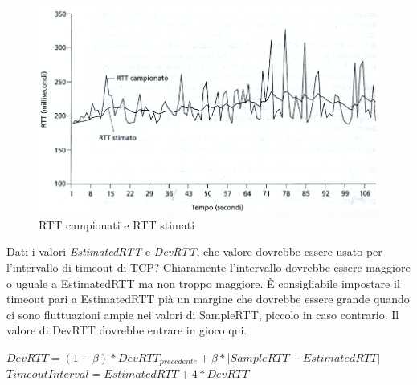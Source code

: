 \documentclass[11pt,a4paper]{article}
\begin{document}
\begin{figure}
	\includegraphics[scale=0.6]{img/032.png}
	\caption{RTT campionati e RTT stimati}
\end{figure}
Dati i valori \emph{EstimatedRTT} e \emph{DevRTT}, che valore dovrebbe essere usato per l'intervallo di timeout di TCP? Chiaramente l'intervallo dovrebbe essere maggiore o uguale a EstimatedRTT ma non troppo maggiore. È consigliabile impostare il timeout pari a EstimatedRTT pià un margine che dovrebbe essere grande quando ci sono fluttuazioni ampie nei valori di SampleRTT, piccolo in caso contrario. Il valore di DevRTT dovrebbe entrare in gioco qui.
\begin{center}
	$DevRTT = (1 - \beta)*DevRTT_{precedente} + \beta*|SampleRTT - EstimatedRTT|$
	$TimeoutInterval = EstimatedRTT + 4 * DevRTT$
\end{center}
\end{document}
